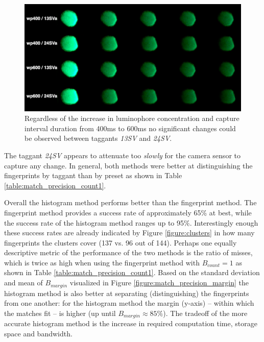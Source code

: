 \documentclass[thesis.tex]{subfiles}
\begin{document}
\begin{figure}[h!]
  \vspace{-2mm}
  \centering \includegraphics[page=1,width=\textwidth]{images/findings/SV}
  \vspace{-8mm}
  \caption{Regardless of the increase in luminophore concentration and capture interval duration from 400ms to 600ms no significant changes could be observed between taggants \emph{13SV} and \emph{24SV}.}
  \label{figure:SV}
\end{figure}

\noindent The taggant \emph{24SV} appears to attenuate too \emph{slowly} for the camera sensor to capture any change. In general, both methods were better at distinguishing the fingerprints by taggant than by preset as shown in Table \ref{table:match_precision_count1}.

Overall the histogram method performs better than the fingerprint method. The fingerprint method provides a success rate of approximately 65\% at best, while the success rate of the histogram method ranges up to 95\%. Interestingly enough these success rates are already indicated by Figure \ref{figure:clusters} in how many fingerprints the clusters cover (137 vs. 96 out of 144). Perhaps one equally descriptive metric of the performance of the two methods is the ratio of misses, which is twice as high when using the fingerprint method with $B_{count} = 1$ as shown in Table \ref{table:match_precision_count1}. Based on the standard deviation and mean of $B_{margin}$ visualized in Figure \ref{figure:match_precision_margin} the histogram method is also better at separating (distinguishing) the fingerprints from one another: for the histogram method the margin (y-axis) -- within which the matches fit -- is higher (up until $B_{margin} \approx 85\%$). The tradeoff of the more accurate histogram method is the increase in required computation time, storage space and bandwidth.
\end{document}

